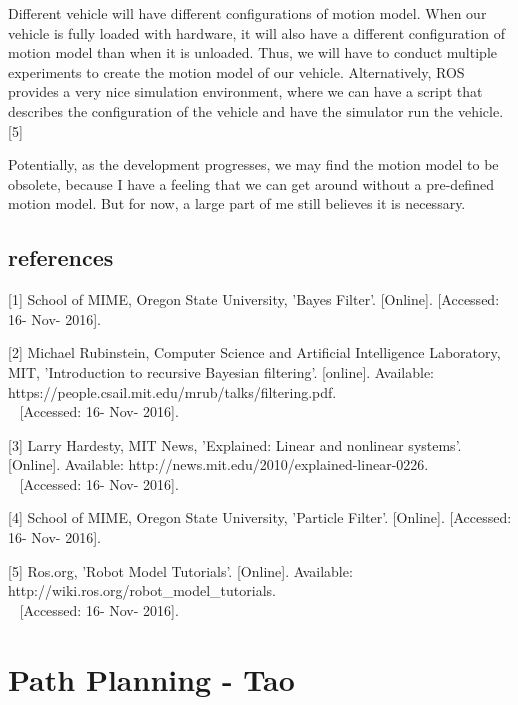 \documentclass[compsoc,draftclsnofoot,onecolumn,10pt]{IEEEtran}
\begin{document}
Different vehicle will have different configurations of motion model. When our vehicle 
is fully loaded with hardware, it will also have a different configuration of motion 
model than when it is unloaded. Thus, we will have to conduct multiple experiments to 
create the motion model of our vehicle. Alternatively, ROS provides a very nice simulation 
environment, where we can have a script that describes the configuration of the vehicle 
and have the simulator run the vehicle. [5]\par

Potentially, as the development progresses, we may find the motion model to be obsolete, 
because I have a feeling that we can get around without a pre-defined motion model. But 
for now, a large part of me still believes it is necessary.\par

\subsection{references}
[1] School of MIME, Oregon State University, 'Bayes Filter'. [Online].
[Accessed: 16- Nov- 2016].\par

[2] Michael Rubinstein, Computer Science and Artificial Intelligence Laboratory, 
MIT, 'Introduction to recursive Bayesian filtering'. [online]. 
Available: https://people.csail.mit.edu/mrub/talks/filtering.pdf.\\~
[Accessed: 16- Nov- 2016].\par  

[3] Larry Hardesty, MIT News, 'Explained: Linear and nonlinear systems'. [Online].
Available: http://news.mit.edu/2010/explained-linear-0226.\\~
[Accessed: 16- Nov- 2016].\par

[4] School of MIME, Oregon State University, 'Particle Filter'. [Online].
[Accessed: 16- Nov- 2016].\par

[5] Ros.org, 'Robot Model Tutorials'. [Online].
Available: http://wiki.ros.org/robot\_model\_tutorials.\\~
[Accessed: 16- Nov- 2016].\par

\newpage

\section{Path Planning - Tao}
\end{document}
